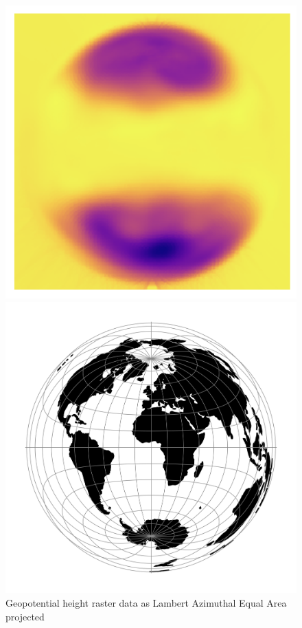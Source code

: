 \begin{figure}[H]
    \centering
    \begin{minipage}{0.30\textwidth}
        \centering
        \includegraphics[width=0.9\linewidth]{figures/chapter-8/geopoth_laea.png}
        \caption{ Geopotential height raster data as Lambert Azimuthal Equal Area projected}
        \label{fig:laea_geopoth_raster}
    \end{minipage}\hfill
    \begin{minipage}{0.30\textwidth}
        \centering
        \includegraphics[width=0.9\linewidth]{figures/chapter-8/laea.png}

\end{minipage}
\end{figure}
